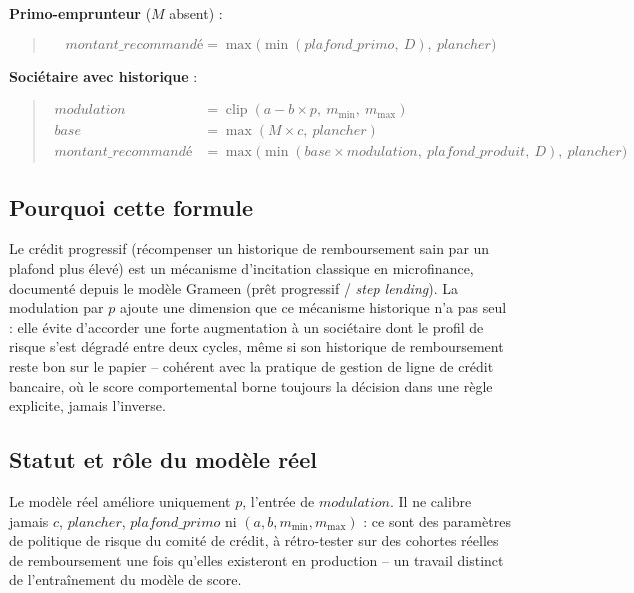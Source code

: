 \documentclass[11pt,a4paper]{article}
\newenvironment{formule}{\begin{quote}}{\end{quote}}
\begin{document}
\textbf{Primo-emprunteur} ($M$ absent) :
\begin{formule}
\[
\mathit{montant\_recommandé} = \max\Big(\min(\mathit{plafond\_primo},\ D),\ \mathit{plancher}\Big)
\]
\end{formule}

\textbf{Sociétaire avec historique} :
\begin{formule}
\begin{align}
\mathit{modulation} &= \operatorname{clip}(a - b \times p,\ m_{\min},\ m_{\max}) \\
\mathit{base} &= \max(M \times c,\ \mathit{plancher}) \\
\mathit{montant\_recommandé} &= \max\Big(\min(\mathit{base} \times \mathit{modulation},\ \mathit{plafond\_produit},\ D),\ \mathit{plancher}\Big)
\end{align}
\end{formule}

\subsection*{Pourquoi cette formule}
Le crédit progressif (récompenser un historique de remboursement sain par un plafond plus élevé)
est un mécanisme d'incitation classique en microfinance, documenté depuis le modèle Grameen
(prêt progressif / \emph{step lending}). La modulation par $p$ ajoute une dimension que ce
mécanisme historique n'a pas seul : elle évite d'accorder une forte augmentation à un sociétaire
dont le profil de risque s'est dégradé entre deux cycles, même si son historique de remboursement
reste bon sur le papier -- cohérent avec la pratique de gestion de ligne de crédit bancaire, où le
score comportemental borne toujours la décision dans une règle explicite, jamais l'inverse.

\subsection*{Statut et rôle du modèle réel}
Le modèle réel améliore uniquement $p$, l'entrée de $\mathit{modulation}$. Il ne calibre jamais
$c$, $\mathit{plancher}$, $\mathit{plafond\_primo}$ ni $(a, b, m_{\min}, m_{\max})$ : ce sont des
paramètres de politique de risque du comité de crédit, à rétro-tester sur des cohortes réelles de
remboursement une fois qu'elles existeront en production -- un travail distinct de l'entraînement
du modèle de score.

\newpage

\end{document}
